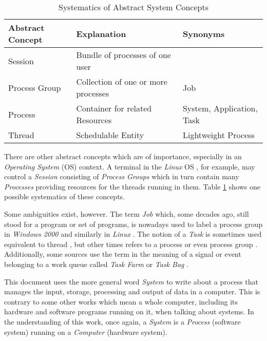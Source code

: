 \begin{table}[ht]
    \begin{center}
        \begin{footnotesize}
        \begin{tabular}{| p{25mm} | p{45mm} | p{35mm} |}
            \hline
            \textbf{Abstract Concept} & \textbf{Explanation} & \textbf{Synonyms}\\
            \hline
            Session & Bundle of processes of one user &\\
            \hline
            Process Group & Collection of one or more processes & Job\\
            \hline
            Process & Container for related Resources & System, Application, Task\\
            \hline
            Thread & Schedulable Entity & Lightweight Process\\
            \hline
        \end{tabular}
        \end{footnotesize}
        \caption{Systematics of Abstract System Concepts}
        \label{concepts_table}
    \end{center}
\end{table}

There are other abstract concepts which are of importance, especially in an
\emph{Operating System} (OS) context. A terminal in the \emph{Linux} OS
\cite{johnson}, for example, may control a \emph{Session} consisting of
\emph{Process Groups} which in turn contain many \emph{Processes} providing
resources for the threads running in them. Table \ref{concepts_table} shows one
possible systematics of these concepts.

Some ambiguities exist, however. The term \emph{Job} which, some decades ago,
still stood for a program or set of programs, is nowadays used to label a
process group in \emph{Windows 2000} \cite[p. 7, 796]{tanenbaum2001} and
similarly in \emph{Linux} \cite[p. 125, 237]{johnson}. The notion of a
\emph{Task} is sometimes used equivalent to thread \cite{daene}, but other
times refers to a process or even process group \cite[p. 113]{johnson}.
Additionally, some sources use the term in the meaning of a signal or event
belonging to a work queue called \emph{Task Farm} or \emph{Task Bag}
\cite[p. 548, 606]{tanenbaum1999}.

This document uses the more general word \emph{System} to write about a process
that manages the input, storage, processing and output of data in a computer.
This is contrary to some other works which mean a whole computer, including its
hardware and software programs running on it, when talking about systems. In
the understanding of this work, once again, a \emph{System} is a \emph{Process}
(software system) running on a \emph{Computer} (hardware system).
